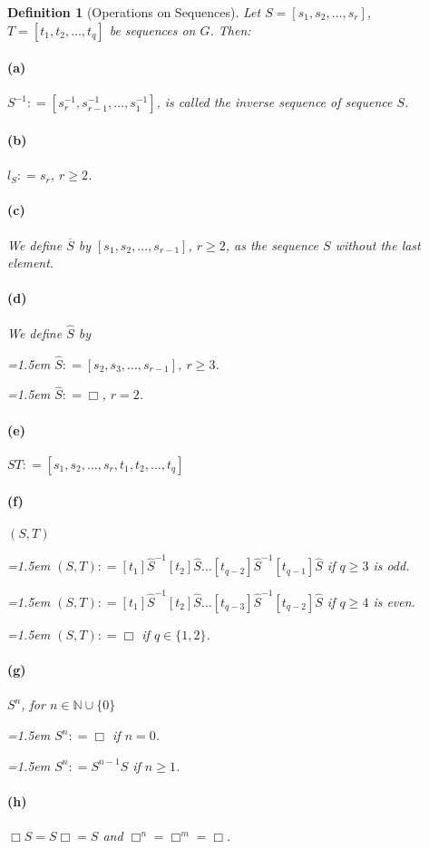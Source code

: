 \documentclass{article}
\newtheorem{definition}{Definition}
\begin{document}
\begin{definition}[Operations on Sequences] 
Let $S = [s_1, s_2, \dots, s_r]$, $T = [t_1, t_2, \dots, t_q]$ be sequences on $G$. Then:
\paragraph{(a)} 
$S^{-1} \colon= [s_r^{-1}, s_{r-1}^{-1}, \dots, s_1^{-1}]$, is called the \textit{inverse sequence} of \textit{sequence} $S$.
\paragraph{(b)} 
$l_S \colon= s_r$, $r\geq 2$.
\paragraph{(c)} 
We define $\overline{S}$ by $[s_1, s_2, \dots, s_{r-1}]$, $r\geq 2$, as the sequence $S$ without the last element.
\paragraph{(d)} 
We define $\hat{S}$ by

\hangindent=1.5em
$\hat{S} \colon= [s_2, s_3, \dots, s_{r-1}]$, $r\geq 3$.

\hangindent=1.5em
$\hat{S} \colon= \Box$, $r = 2$.
\paragraph{(e)} 
$ST \colon= [s_1, s_2, \dots, s_r, t_1, t_2, \dots, t_q]$
\paragraph{(f)} 
$(S, T)$

\hangindent=1.5em
$(S, T) \colon= [t_1]\hat{S}^{-1}[t_2]\hat{S} \dots [t_{q-2}]\hat{S}^{-1}[t_{q-1}]\hat{S}$ if $q \geq 3$ is odd.

\hangindent=1.5em
$(S, T) \colon=[t_1]\hat{S}^{-1}[t_2]\hat{S} \dots [t_{q-3}]\hat{S}^{-1}[t_{q-2}]\hat{S}$ if $q \geq 4$ is even.

\hangindent=1.5em
$(S, T) \colon=\Box$ if $q \in \{1, 2\}$.
\paragraph{(g)} 
$S^n$, for $n\in \mathbb{N} \cup \{0\}$

\hangindent=1.5em
$S^n \colon=\Box$ if $n = 0$.

\hangindent=1.5em
$S^n \colon= S^{n-1}S$ if $n \geq 1$.

\paragraph{(h)} 
$\Box S = S\Box = S$ and $\Box^n = \Box^m = \Box$.
\end{definition}
\end{document}
